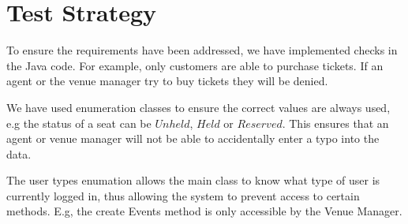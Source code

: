 \chapter{Test Strategy}


To ensure the requirements have been addressed, we have implemented checks in the Java code. For example, only customers are able to purchase tickets. If an agent or the venue manager try to buy tickets they will be denied.

We have used enumeration classes to ensure the correct values are always used, e.g the status of a seat can be $Unheld$, $Held$ or $Reserved$. This ensures that an agent or venue manager will not be able to accidentally enter a typo into the data.

The user types enumation allows the main class to know what type of user is currently logged in, thus allowing the system to prevent access to certain methods. E.g, the create Events method is only accessible by the Venue Manager.
